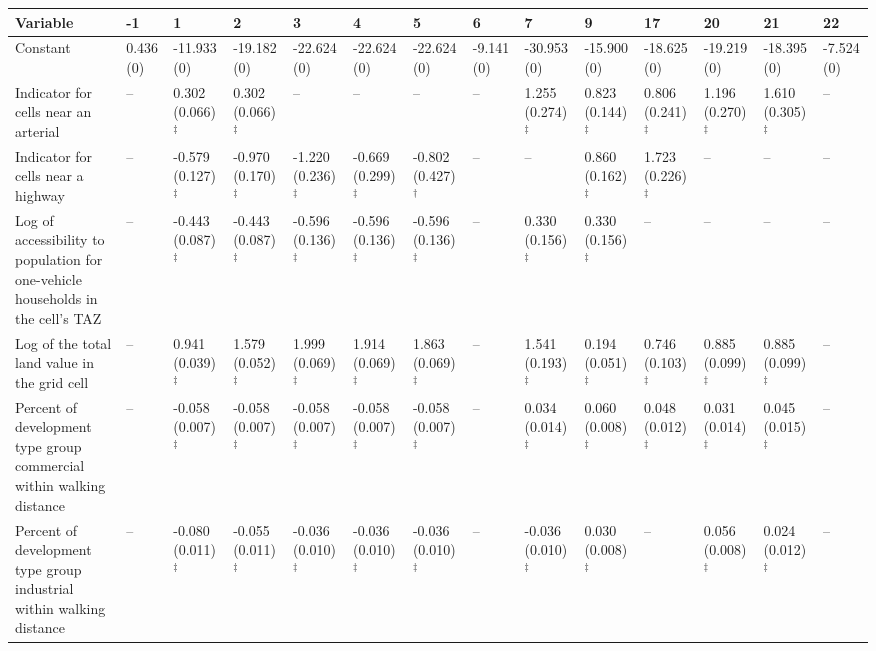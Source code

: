 
\begin{tabular}{p{3in}p{0.5in}p{0.5in}p{0.5in}p{0.5in}p{0.5in}p{0.5in}p{0.5in}p{0.5in}p{0.5in}p{0.5in}p{0.5in}p{0.5in}p{0.5in}}
\hline\hline
Variable & -1 & 1 & 2 & 3 & 4 & 5 & 6 & 7 & 9 & 17 & 20 & 21 & 22 \\\hline
Constant & 0.436 (0) & -11.933 (0) & -19.182 (0) & -22.624 (0) & -22.624 (0) & -22.624 (0) & -9.141 (0) & -30.953 (0) & -15.900 (0) & -18.625 (0) & -19.219 (0) & -18.395 (0) & -7.524 (0) \\
Indicator for cells near an arterial & -- & 0.302 (0.066)$^{\ddagger}$ & 0.302 (0.066)$^{\ddagger}$ & -- & -- & -- & -- & 1.255 (0.274)$^{\ddagger}$ & 0.823 (0.144)$^{\ddagger}$ & 0.806 (0.241)$^{\ddagger}$ & 1.196 (0.270)$^{\ddagger}$ & 1.610 (0.305)$^{\ddagger}$ & -- \\
Indicator for cells near a highway & -- & -0.579 (0.127)$^{\ddagger}$ & -0.970 (0.170)$^{\ddagger}$ & -1.220 (0.236)$^{\ddagger}$ & -0.669 (0.299)$^{\ddagger}$ & -0.802 (0.427)$^{\dagger}$ & -- & -- & 0.860 (0.162)$^{\ddagger}$ & 1.723 (0.226)$^{\ddagger}$ & -- & -- & -- \\
Log of accessibility to population for one-vehicle households in the cell's TAZ & -- & -0.443 (0.087)$^{\ddagger}$ & -0.443 (0.087)$^{\ddagger}$ & -0.596 (0.136)$^{\ddagger}$ & -0.596 (0.136)$^{\ddagger}$ & -0.596 (0.136)$^{\ddagger}$ & -- & 0.330 (0.156)$^{\ddagger}$ & 0.330 (0.156)$^{\ddagger}$ & -- & -- & -- & -- \\
Log of the total land value in the grid cell & -- & 0.941 (0.039)$^{\ddagger}$ & 1.579 (0.052)$^{\ddagger}$ & 1.999 (0.069)$^{\ddagger}$ & 1.914 (0.069)$^{\ddagger}$ & 1.863 (0.069)$^{\ddagger}$ & -- & 1.541 (0.193)$^{\ddagger}$ & 0.194 (0.051)$^{\ddagger}$ & 0.746 (0.103)$^{\ddagger}$ & 0.885 (0.099)$^{\ddagger}$ & 0.885 (0.099)$^{\ddagger}$ & -- \\
Percent of development type group commercial within walking distance & -- & -0.058 (0.007)$^{\ddagger}$ & -0.058 (0.007)$^{\ddagger}$ & -0.058 (0.007)$^{\ddagger}$ & -0.058 (0.007)$^{\ddagger}$ & -0.058 (0.007)$^{\ddagger}$ & -- & 0.034 (0.014)$^{\ddagger}$ & 0.060 (0.008)$^{\ddagger}$ & 0.048 (0.012)$^{\ddagger}$ & 0.031 (0.014)$^{\ddagger}$ & 0.045 (0.015)$^{\ddagger}$ & -- \\
Percent of development type group industrial within walking distance & -- & -0.080 (0.011)$^{\ddagger}$ & -0.055 (0.011)$^{\ddagger}$ & -0.036 (0.010)$^{\ddagger}$ & -0.036 (0.010)$^{\ddagger}$ & -0.036 (0.010)$^{\ddagger}$ & -- & -0.036 (0.010)$^{\ddagger}$ & 0.030 (0.008)$^{\ddagger}$ & -- & 0.056 (0.008)$^{\ddagger}$ & 0.024 (0.012)$^{\ddagger}$ & -- \\

\end{tabular}
